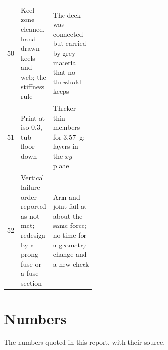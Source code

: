 \begin{xltabular}{\linewidth}{@{}r>{\raggedright\arraybackslash}p{0.36\linewidth}X@{}}
50 & Keel zone cleaned, hand-drawn keels and web; the stiffness rule & The deck was connected but carried by grey material that no threshold keeps\\
51 & Print at iso 0.3, tub floor-down & Thicker thin members for \SI{3.57}{g}; layers in the $xy$ plane\\
52 & Vertical failure order reported as not met; redesign by a prong fuse or a fuse section & Arm and joint fail at about the same force; no time for a geometry change and a new check\\
\end{xltabular}
\normalsize

\section{Numbers}\label{sec:logs-numbers}

The numbers quoted in this report, with their source.

